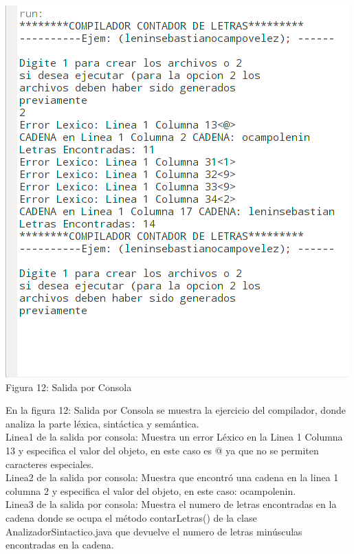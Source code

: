 \documentclass[a4paper,openright,12pt]{article}
\begin{document}
\begin{center}
\includegraphics[height=0.5\textheight]{salida.png}
\\
Figura 12: Salida por Consola
\end{center}


En la figura 12: Salida por Consola se muestra la ejercicio del compilador, donde analiza la parte léxica, sintáctica y semántica.\\

Linea1 de la salida por consola: Muestra un error Léxico en la Linea 1 Columna 13 y especifica el valor del objeto, en este caso es @ ya que no se permiten caracteres especiales.\\

Linea2 de la salida por consola: Muestra que encontró una cadena en la linea 1 columna 2 y especifica el valor del objeto, en este caso: ocampolenin.\\

Linea3 de la salida por consola: Muestra el numero de letras encontradas en la cadena donde se ocupa el método contarLetras() de la clase AnalizadorSintactico.java que devuelve el numero de letras minúsculas encontradas en la cadena. \\
\end{document}
